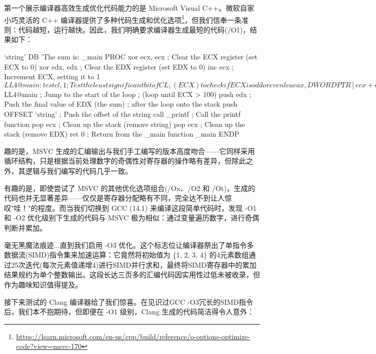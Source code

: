 第一个展示编译器高效生成优化代码能力的是 Microsoft Visual C++。微软自家小巧灵活的 C++ 编译器提供了多种代码生成和优化选项\footnote{\url{https://learn.microsoft.com/en-us/cpp/build/reference/o-options-optimize-code?view=msvc-170}}，但我们信奉一条准则：代码越短，运行越快。因此，我们明确要求编译器生成最短的代码(/O1)，结果如下：

\begin{shell}
`string' DB 'The sum is: %
_main PROC
  xor ecx, ecx  ; Clear the ECX register (set ECX to 0)
  xor edx, edx  ; Clear the EDX register (set EDX to 0)
  inc ecx       ; Increment ECX, setting it to 1
  $LL4@main:
  test cl, 1    ; Test the least significant bit of CL
                ; (ECX) to check if ECX is odd or even
  lea eax, DWORD PTR [ecx+edx] ; Load the effective
                ; address of ECX + EDX into EAX
  cmove eax, edx; If the zero flag is set
                ; (ECX was even), move EDX into EAX
  inc ecx       ; Increment ECX by 1
  mov edx, eax  ; Move the value in EAX to EDX
                ; (update EDX for the next iteration)
  cmp ecx, 100  ; Compare ECX with 100
  jle SHORT $LL4@main ; Jump to the start of the loop
                ; (loop until ECX > 100)
  push edx      ; Push the final value of EDX (the sum)
                ; after the loop onto the stack
  push OFFSET `string' ; Push the offset of the string
  call _printf  ; Call the printf function
  pop ecx       ; Clean up the stack (remove string)
  pop ecx       ; Clean up the stack (remove EDX)
  ret 0         ; Return from the _main function
_main ENDP
\end{shell}

趣的是，MSVC 生成的汇编输出与我们手工编写的版本高度吻合——它同样采用循环结构，只是根据当前处理数字的奇偶性对寄存器的操作略有差异，但除此之外，其逻辑与我们编写的代码几乎一致。

有趣的是，即使尝试了 MSVC 的其他优化选项组合(/Ox、/O2 和 /Ot)，生成的代码也并无显著差异——仅仅是寄存器分配略有不同，完全达不到让人惊叹"哇！"的程度。而当我们切换到 GCC (14.1) 来编译这段简单代码时，发现 -O1 和 -O2 优化级别下生成的代码与 MSVC 极为相似：通过变量遍历数字，进行奇偶判断并累加。

毫无黑魔法痕迹...直到我们启用 -O3 优化。这个标志位让编译器祭出了单指令多数据流(SIMD)指令集来加速运算：它竟然将初始值为 \{1, 2, 3, 4\} 的4元素数组通过25次迭代(每次元素值递增4)进行SIMD并行求和，最终将SIMD寄存器中的累加结果规约为单个整数输出。这段长达三页多的汇编代码因实用性过低未被收录，但作为趣味知识值得提及。

接下来测试的 Clang 编译器给了我们惊喜。在见识过GCC -O3冗长的SIMD指令后，我们本不抱期待，但即便在 -O1 级别，Clang 生成的代码简洁得令人意外：

